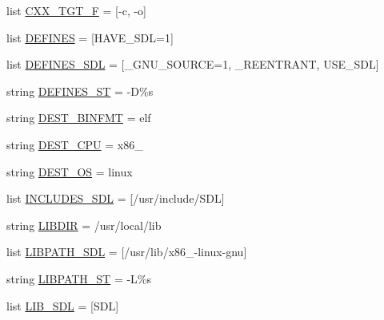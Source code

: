 \begin{DoxyCompactItemize}
list \hyperlink{namespace__cache_ade3c7d41446fa1896e18d16809cef157}{C\+X\+X\+\_\+\+T\+G\+T\+\_\+F} = \mbox{[}\textquotesingle{}-\/c\textquotesingle{}, \textquotesingle{}-\/o\textquotesingle{}\mbox{]}
\item 
list \hyperlink{namespace__cache_a662b9c55150aee883a622482cae5dab0}{D\+E\+F\+I\+N\+ES} = \mbox{[}\textquotesingle{}H\+A\+V\+E\+\_\+\+S\+DL=1\textquotesingle{}\mbox{]}
\item 
list \hyperlink{namespace__cache_a2f75ff22e404864c30421dd4d36f7d10}{D\+E\+F\+I\+N\+E\+S\+\_\+\+S\+DL} = \mbox{[}\textquotesingle{}\+\_\+\+G\+N\+U\+\_\+\+S\+O\+U\+R\+CE=1\textquotesingle{}, \textquotesingle{}\+\_\+\+R\+E\+E\+N\+T\+R\+A\+NT\textquotesingle{}, \textquotesingle{}U\+S\+E\+\_\+\+S\+DL\textquotesingle{}\mbox{]}
\item 
string \hyperlink{namespace__cache_aa0561cd9e9967e79374d25f0b2124c31}{D\+E\+F\+I\+N\+E\+S\+\_\+\+ST} = \textquotesingle{}-\/D\%s\textquotesingle{}
\item 
string \hyperlink{namespace__cache_af0f6f6c7fb6b15237da871e6c57f7715}{D\+E\+S\+T\+\_\+\+B\+I\+N\+F\+MT} = \textquotesingle{}elf\textquotesingle{}
\item 
string \hyperlink{namespace__cache_a2aa5ac51ce1b482ae69fc9ab02247141}{D\+E\+S\+T\+\_\+\+C\+PU} = \textquotesingle{}x86\+\_\textquotesingle{}
\item 
string \hyperlink{namespace__cache_aaf5df9716e0e7e9206927267988e2c3c}{D\+E\+S\+T\+\_\+\+OS} = \textquotesingle{}linux\textquotesingle{}
\item 
list \hyperlink{namespace__cache_abe068f55e39c51887f13d646eccbc277}{I\+N\+C\+L\+U\+D\+E\+S\+\_\+\+S\+DL} = \mbox{[}\textquotesingle{}/usr/include/S\+DL\textquotesingle{}\mbox{]}
\item 
string \hyperlink{namespace__cache_a5430fc8ffbbafabc378f151d608651e1}{L\+I\+B\+D\+IR} = \textquotesingle{}/usr/local/lib\textquotesingle{}
\item 
list \hyperlink{namespace__cache_a48363bc6728d7c8fa43e722376c8c117}{L\+I\+B\+P\+A\+T\+H\+\_\+\+S\+DL} = \mbox{[}\textquotesingle{}/usr/lib/x86\+\_-\/linux-\/gnu\textquotesingle{}\mbox{]}
\item 
string \hyperlink{namespace__cache_a9e16b0dc1f0b6105de5d5ffbfb38a55e}{L\+I\+B\+P\+A\+T\+H\+\_\+\+ST} = \textquotesingle{}-\/L\%s\textquotesingle{}
\item 
list \hyperlink{namespace__cache_acf6ec91a526e860515379d713ce250d0}{L\+I\+B\+\_\+\+S\+DL} = \mbox{[}\textquotesingle{}S\+DL\textquotesingle{}\mbox{]}
\item 

\end{DoxyCompactItemize}
